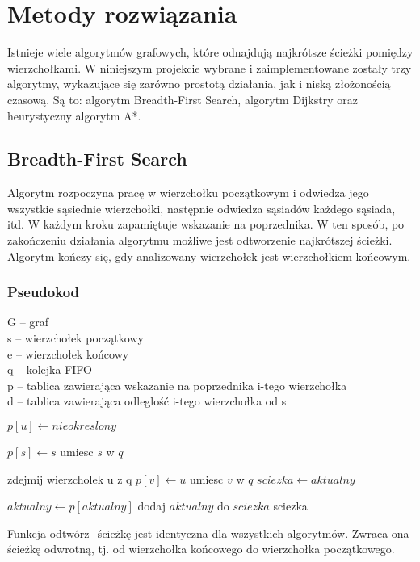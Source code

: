 \documentclass[11pt,a4paper]{article}
\begin{document}
\section{Metody rozwiązania}
Istnieje wiele algorytmów grafowych, które odnajdują najkrótsze ścieżki pomiędzy
wierzchołkami. W niniejszym projekcie wybrane i zaimplementowane zostały trzy
algorytmy, wykazujące się zarówno prostotą działania, jak i niską złożonością
czasową. Są to: algorytm Breadth-First Search, algorytm Dijkstry oraz heurystyczny algorytm A*.

\subsection{Breadth-First Search}
Algorytm rozpoczyna pracę w wierzchołku początkowym i odwiedza jego wszystkie sąsiednie wierzchołki,
następnie odwiedza sąsiadów każdego sąsiada, itd. W każdym kroku zapamiętuje wskazanie na poprzednika.
W ten sposób, po zakończeniu działania algorytmu możliwe jest odtworzenie
najkrótszej ścieżki. Algorytm kończy się, gdy analizowany wierzchołek jest wierzchołkiem końcowym.

\subsubsection{Pseudokod}\label{bfs_pseudokod}
G – graf\\
s – wierzchołek początkowy\\
e – wierzchołek końcowy\\
q – kolejka FIFO\\
p – tablica zawierająca wskazanie na poprzednika i-tego wierzchołka\\
d – tablica zawierająca odleglość i-tego wierzchołka od s\\
\begin{algorithmic}
   	\State $p[u]\gets nieokreslony$
   \EndFor
   
   \State $p[s]\gets s$
   \State umiesc $s$ w $q$
   
   	\State zdejmij wierzcholek u z q
   	 \Return
   	\EndIf
   			\State $p[v]\gets u$
   			\State umiesc $v$ w $q$
   		\EndIf
   \EndFor
   \EndWhile
\EndFunction
\Statex
{}
	\State $sciezka\gets aktualny$
   
   	\State $aktualny\gets p[aktualny]$
   	\State dodaj $aktualny$ do $sciezka$
   \EndWhile
   \Return sciezka
\EndFunction
\end{algorithmic}
\vspace{5mm}
Funkcja odtwórz\_ścieżkę jest identyczna dla wszystkich algorytmów. Zwraca ona ścieżkę odwrotną, tj. od wierzchołka końcowego do wierzchołka początkowego.
\end{document}
